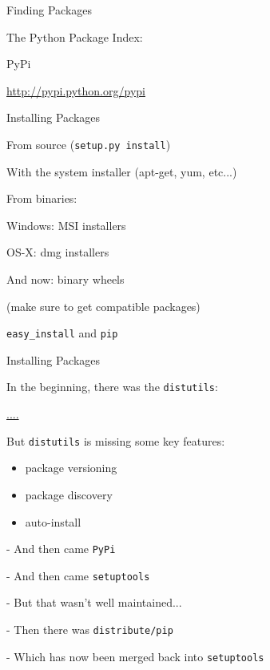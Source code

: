 \documentclass{beamer}
\begin{document}
\begin{frame}[fragile]{Finding Packages}

{\Large The Python Package Index:}

\vfill
{\LARGE PyPi}

\vfill
\url{http://pypi.python.org/pypi}

\end{frame} 

\begin{frame}[fragile]{Installing Packages}

{\Large From source}
(\verb|setup.py install|)

\vfill
{\Large With the system installer (apt-get, yum, etc...)}

\vfill
{\Large From binaries: }

\vfill
{\Large Windows:} MSI installers

\vfill
{\Large OS-X:} dmg installers 

\vfill
{\Large And now:} binary wheels

(make sure to get compatible packages)

\vfill
{\Large \verb|easy_install| and \verb|pip|}

\end{frame} 

\begin{frame}[fragile]{Installing Packages}

{\Large In the beginning, there was the \verb|distutils|:}

\url{....}

{\Large But \verb|distutils| is missing some key features:}
\begin{itemize}
  \item package versioning
  \item package discovery
  \item auto-install
\end{itemize}

\vfill
{\Large - And then came \verb|PyPi|}

\vfill
{\Large - And then came \verb|setuptools|}

\vfill
{\Large - But that wasn't well maintained...}

\vfill
{\Large - Then there was \verb|distribute/pip|}

\vfill
{\Large - Which has now been merged back into \verb|setuptools|}

\end{frame} 
\end{document}
